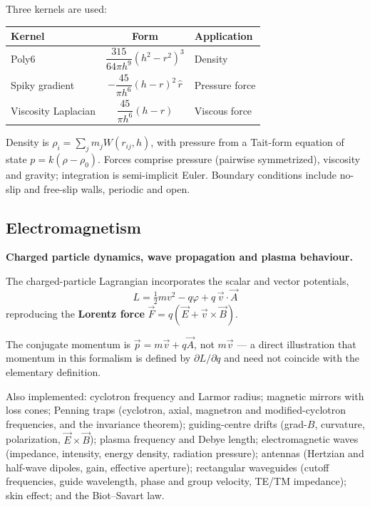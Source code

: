 \documentclass[11pt,a4paper]{article}
\begin{document}
Three kernels are used:

\begin{center}
\begin{tabular}{@{}lcl@{}}
\toprule
\textbf{Kernel} & \textbf{Form} & \textbf{Application} \\
\midrule
Poly6                & $\dfrac{315}{64\pi h^9}\left(h^2 - r^2\right)^3$ & Density \\[0.9em]
Spiky gradient       & $-\dfrac{45}{\pi h^6}(h - r)^2\,\hat{r}$         & Pressure force \\[0.9em]
Viscosity Laplacian  & $\dfrac{45}{\pi h^6}(h - r)$                     & Viscous force \\
\bottomrule
\end{tabular}
\end{center}

Density is $\rho_i = \sum_j m_j W(r_{ij}, h)$, with pressure from a Tait-form equation of state
$p = k(\rho - \rho_0)$. Forces comprise pressure (pairwise symmetrized), viscosity and gravity;
integration is semi-implicit Euler. Boundary conditions include no-slip and free-slip walls, periodic
and open.

\subsection{Electromagnetism}

\textbf{Charged particle dynamics, wave propagation and plasma behaviour.}

The charged-particle Lagrangian incorporates the scalar and vector potentials,
\begin{equation}
L = \tfrac{1}{2}mv^2 - q\varphi + q\,\vec{v}\cdot\vec{A}
\end{equation}
reproducing the \textbf{Lorentz force} $\vec F = q(\vec E + \vec v \times \vec B)$.

The conjugate momentum is $\vec p = m\vec v + q\vec A$, not $m\vec v$ --- a direct illustration that
momentum in this formalism is defined by $\partial L/\partial\dot q$ and need not coincide with the
elementary definition.

Also implemented: cyclotron frequency and Larmor radius; magnetic mirrors with loss cones; Penning
traps (cyclotron, axial, magnetron and modified-cyclotron frequencies, and the invariance theorem);
guiding-centre drifts (grad-$B$, curvature, polarization, $\vec E \times \vec B$); plasma frequency
and Debye length; electromagnetic waves (impedance, intensity, energy density, radiation pressure);
antennas (Hertzian and half-wave dipoles, gain, effective aperture); rectangular waveguides (cutoff
frequencies, guide wavelength, phase and group velocity, TE/TM impedance); skin effect; and the
Biot--Savart law.
\end{document}
